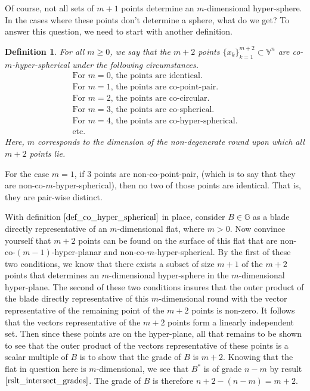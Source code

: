 \documentclass[12pt]{article}
\newcommand{\G}{\mathbb{G}}
\newcommand{\V}{\mathbb{V}}
\newtheorem{definition}{Definition}[section]
\begin{document}
Of course, not all sets of $m+1$ points determine
an $m$-dimensional hyper-sphere.  In the cases where these points don't determine a sphere, what do
we get?  To answer this question, we need to start with another definition.
\begin{definition}\label{def_co_hyper_spherical}
For all $m\geq 0$, we say that the $m+2$ points $\{x_k\}_{k=1}^{m+2}\subset\V^n$
are co-$m$-hyper-spherical under the following circumstances.
\begin{equation*}
\begin{array}{l}
\mbox{For $m=0$, the points are identical.} \\
\mbox{For $m=1$, the points are co-point-pair.} \\
\mbox{For $m=2$, the points are co-circular.} \\
\mbox{For $m=3$, the points are co-spherical.} \\
\mbox{For $m=4$, the points are co-hyper-spherical.} \\
\mbox{etc.}
\end{array}
\end{equation*}
Here, $m$ corresponds to the dimension of the non-degenerate round upon
which all $m+2$ points lie.
\end{definition}

For the case $m=1$, if 3 points are non-co-point-pair, (which is to say that
they are non-co-$m$-hyper-spherical), then no two of those points are identical.
That is, they are pair-wise distinct.

With definition $\eqref{def_co_hyper_spherical}$ in place, consider $B\in\G$ as a blade directly representative
of an $m$-dimensional flat, where $m>0$.  Now convince yourself that $m+2$ points can
be found on the surface of this flat that are non-co-$(m-1)$-hyper-planar
and non-co-$m$-hyper-spherical.  By the first of these two conditions,
we know that there exists a subset of size $m+1$ of the $m+2$ points that
determines an $m$-dimensional hyper-sphere in the $m$-dimensional hyper-plane.
The second of these two conditions insures that the outer product
of the blade directly representative of this $m$-dimensional round
with the vector representative of the remaining point of the $m+2$
points is non-zero.  It follows that the vectors representative
of the $m+2$ points form a linearly independent set.  Then since
these points are on the hyper-plane, all that remains to be shown
to see that the outer product of the vectors representative of these
points is a scalar multiple of $B$ is to show that the grade of $B$ is $m+2$.
Knowing that the flat in question here is $m$-dimensional, we see that $B^*$
is of grade $n-m$ by result $\eqref{rslt_intersect_grades}$.
The grade of $B$ is therefore $n+2-(n-m)=m+2$.
\end{document}
